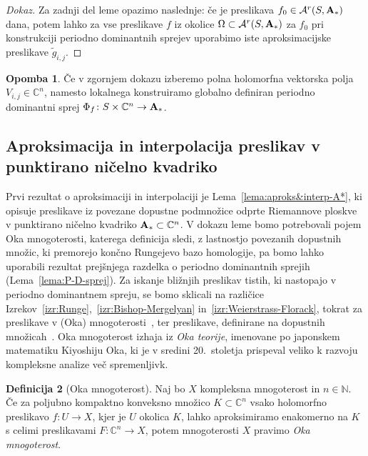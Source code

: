 \documentclass[12pt,a4paper,twoside]{article}
\theoremstyle{definition} %
\newtheorem{definicija}{Definicija}[section]
\newtheorem{opomba}[definicija]{Opomba}
\newenvironment{dokaz}[1][Dokaz]{\begin{proof}[#1]}{\end{proof}}
\theoremstyle{plain} %
\numberwithin{equation}{section}  %
\begin{document}
\begin{dokaz}
Za zadnji del leme opazimo naslednje: če je preslikava $f_{0} \in \mathcal{A}^{r}(S, \textbf{\textup{A}}_{*})$ dana, potem lahko za vse preslikave $f$ iz okolice $\Omega \subset \mathcal{A}^{r}(S, \textbf{\textup{A}}_{*})$ za $f_{0}$ pri konstrukciji periodno dominantnih sprejev uporabimo iste aproksimacijske preslikave $\tilde{g}_{i,j}$.
\end{dokaz}

\begin{opomba} \label{op:PDS-globalno}
Če v zgornjem dokazu izberemo polna holomorfna vektorska polja $V_{i,j} \in \mathbb{C}^{n}$, namesto lokalnega konstruiramo globalno definiran periodno dominantni sprej $\Phi_{f} \colon S \times \mathbb{C}^{n} \to \textbf{\textup{A}}_{*}$.
\end{opomba}

\subsection{Aproksimacija in interpolacija preslikav v punktirano ničelno kvadriko}
%
Prvi rezultat o aproksimaciji in interpolaciji je Lema~\ref{lema:aproks&interp-A*}, ki opisuje preslikave iz povezane dopustne podmnožice odprte Riemannove ploskve v punktirano ničelno kvadriko $\textbf{\textup{A}}_{*} \subset \mathbb{C}^{n}$.
V dokazu leme bomo potrebovali pojem Oka mnogoterosti, katerega definicija sledi, z lastnostjo povezanih dopustnih množic, ki premorejo končno Rungejevo bazo homologije, pa bomo lahko uporabili rezultat prejšnjega razdelka o periodno dominantnih sprejih (Lema~\ref{lema:P-D-sprej}).
Za iskanje bližnjih preslikav tistih, ki nastopajo v periodno dominantnem spreju, se bomo sklicali na različice Izrekov~\ref{izr:Runge},~\ref{izr:Bishop-Mergelyan} in~\ref{izr:Weierstrass-Florack}, tokrat za preslikave v (Oka) mnogoterosti~\cite[Theorem~1.13.1,~1.13.3]{alarcon2021minimal},
ter preslikave, definirane na dopustnih množicah~\cite[Theorem~1.12.11]{alarcon2021minimal}.
Oka mnogoterost izhaja iz \emph{Oka teorije}, imenovane po japonskem matematiku Kiyoshiju Oka, ki je v sredini 20.~stoletja prispeval veliko k razvoju kompleksne analize več spremenljivk.

\begin{definicija} [Oka mnogoterost]
Naj bo $X$ kompleksna mnogoterost in $n \in \mathbb{N}$. Če za poljubno kompaktno konveksno množico $K \subset \mathbb{C}^{n}$ vsako holomorfno preslikavo $f \colon U \to X$, kjer je $U$ okolica $K$, lahko aproksimiramo enakomerno na $K$ s celimi preslikavami $F \colon \mathbb{C}^{n} \to X$, potem mnogoterosti $X$ pravimo \emph{Oka mnogoterost}.
\end{definicija}
\end{document}
